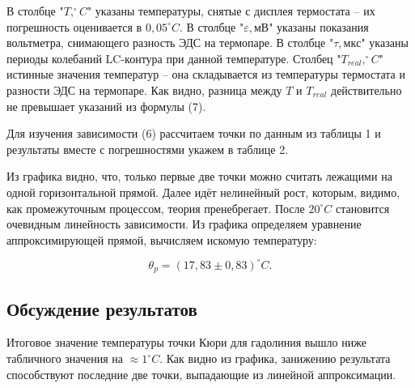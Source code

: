 В столбце "$T, ^\circ C$" указаны температуры, снятые с дисплея термостата -- их погрешность оценивается в $0,05 ^\circ C$. В столбце "$\varepsilon, мВ$" указаны показания вольтметра, снимающего разность ЭДС на термопаре. В столбце "$\tau, мкс$" указаны периоды колебаний LC-контура при данной температуре. Столбец "$T_{real}, ^\circ C$" истинные значения температур -- она складывается из температуры термостата и разности ЭДС на термопаре. Как видно, разница между $T$ и $T_{real}$ действительно не превышает указаний из формулы (7).

Для изучения зависимости (6) рассчитаем точки по данным из таблицы 1 и результаты вместе с погрешностями укажем в таблице 2. 

Из графика видно, что, только первые две точки можно считать лежащими на одной горизонтальной прямой. Далее идёт нелинейный рост, которым, видимо, как промежуточным процессом, теория пренебрегает. После $20 ^\circ C$ становится очевидным линейность зависимости. Из графика определяем уравнение аппроксимирующей прямой, вычисляем искомую температуру:

\begin{equation}
    \theta_p = (17,83\pm0,83) ^\circ C.
\end{equation}

\subsection*{Обсуждение результатов}

Итоговое значение температуры точки Кюри для гадолиния вышло ниже табличного значения на $\approx 1 ^\circ C$. Как видно из графика, занижению результата способствуют последние две точки, выпадающие из линейной аппроксимации.


